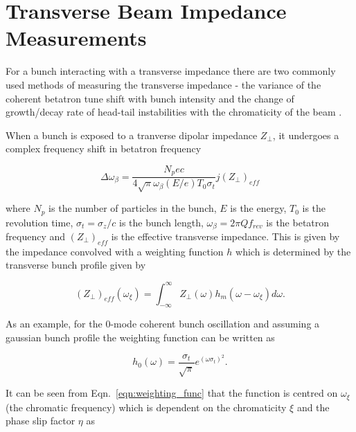 \section{Transverse Beam Impedance Measurements}


For a bunch interacting with a transverse impedance there are two commonly used methods of measuring the transverse impedance - the variance of the coherent betatron tune shift with bunch intensity and the change of growth/decay rate of head-tail instabilities with the chromaticity of the beam \cite{Sacherer:BunchBeamEffects}.

When a bunch is exposed to a tranverse dipolar impedance $Z_{\perp}$, it undergoes a complex frequency shift in betatron frequency


\begin{equation}
\Delta{}\omega_{\beta} = \frac{N_{p}ec}{4\sqrt{\pi}\omega_{\beta} \left( E/e \right)T_{0}\sigma_{t}} j\left( Z_{\perp} \right)_{eff}
\label{eqn:complex_tun_shift}
\end{equation}

where $N_{p}$ is the number of particles in the bunch, $E$ is the energy, $T_{0}$ is the revolution time, $\sigma_{t} = \sigma_{z}/c$ is the bunch length, $\omega_{\beta} = 2\pi{}Q f_{rev}$ is the betatron frequency and $\left( Z_{\perp} \right)_{eff}$ is the effective transverse impedance. This is given by the impedance convolved with a weighting function $h$ which is determined by the transverse bunch profile given by

\begin{equation}
\left( Z_{\perp} \right)_{eff} \left( \omega_{\xi} \right) = \int_{-\infty}^{\infty} Z_{\perp} \left( \omega \right) h_{m} \left(  \omega - \omega_{\xi} \right) d\omega.
\end{equation}

As an example, for the 0-mode coherent bunch oscillation and assuming a gaussian bunch profile the weighting function can be written as

\begin{equation}
h_{0} \left( \omega \right) = \frac{\sigma_{t}}{\sqrt{\pi}}e^{ \left(  \omega \sigma_{t}  \right)^{2}}.
\label{eqn:weighting_func}
\end{equation}

It can be seen from Eqn.~\ref{eqn:weighting_func} that the function is centred on $\omega_{\xi}$ (the chromatic frequency) which is dependent on the chromaticity $\xi$ and the phase slip factor $\eta$ as

